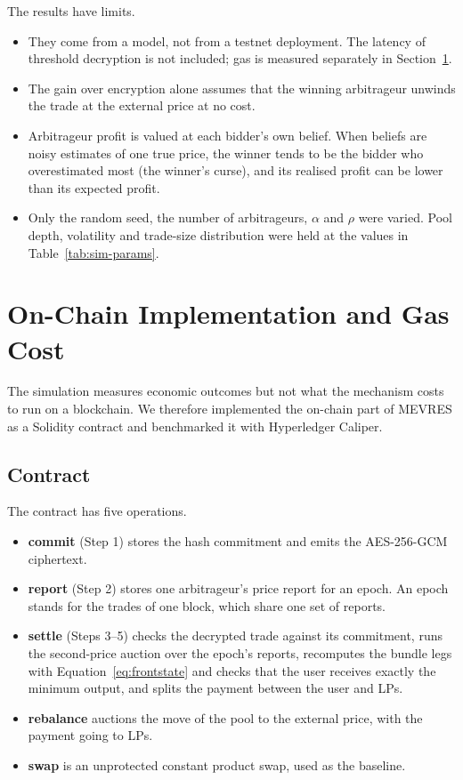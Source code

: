 The results have limits.
\begin{itemize}
    \item They come from a model, not from a testnet deployment. The latency of threshold decryption is not included; gas is measured separately in Section~\ref{sec:onchain}.
    \item The gain over encryption alone assumes that the winning arbitrageur unwinds the trade at the external price at no cost.
    \item Arbitrageur profit is valued at each bidder's own belief. When beliefs are noisy estimates of one true price, the winner tends to be the bidder who overestimated most (the winner's curse), and its realised profit can be lower than its expected profit.
    \item Only the random seed, the number of arbitrageurs, $\alpha$ and $\rho$ were varied. Pool depth, volatility and trade-size distribution were held at the values in Table~\ref{tab:sim-params}.
\end{itemize}

\section{On-Chain Implementation and Gas Cost}
\label{sec:onchain}

The simulation measures economic outcomes but not what the mechanism costs to run on a blockchain. We therefore implemented the on-chain part of MEVRES as a Solidity contract and benchmarked it with Hyperledger Caliper.

\subsection{Contract}

The contract has five operations.
\begin{itemize}
    \item \textbf{commit} (Step 1) stores the hash commitment and emits the AES-256-GCM ciphertext.
    \item \textbf{report} (Step 2) stores one arbitrageur's price report for an epoch. An epoch stands for the trades of one block, which share one set of reports.
    \item \textbf{settle} (Steps 3--5) checks the decrypted trade against its commitment, runs the second-price auction over the epoch's reports, recomputes the bundle legs with Equation~\ref{eq:frontstate} and checks that the user receives exactly the minimum output, and splits the payment between the user and LPs.
    \item \textbf{rebalance} auctions the move of the pool to the external price, with the payment going to LPs.
    \item \textbf{swap} is an unprotected constant product swap, used as the baseline.
\end{itemize}

